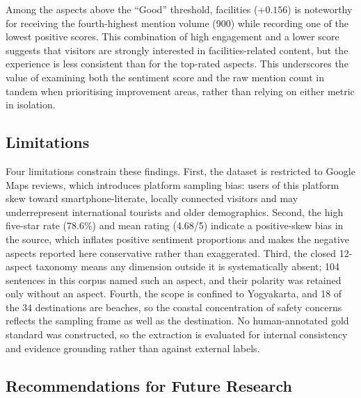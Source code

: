\documentclass[pdflatex,sn-mathphys-num]{sn-jnl}
\begin{document}
Among the aspects above the ``Good'' threshold, facilities ($+0.156$) is noteworthy for receiving the fourth-highest mention volume (900) while recording one of the lowest positive scores. This combination of high engagement and a lower score suggests that visitors are strongly interested in facilities-related content, but the experience is less consistent than for the top-rated aspects. This underscores the value of examining both the sentiment score and the raw mention count in tandem when prioritising improvement areas, rather than relying on either metric in isolation.

\subsection{Limitations}\label{subsec10}

Four limitations constrain these findings. First, the dataset is restricted to Google Maps reviews, which introduces platform sampling bias: users of this platform skew toward smartphone-literate, locally connected visitors and may underrepresent international tourists and older demographics. Second, the high five-star rate (78.6\%) and mean rating (4.68/5) indicate a positive-skew bias in the source, which inflates positive sentiment proportions and makes the negative aspects reported here conservative rather than exaggerated. Third, the closed 12-aspect taxonomy means any dimension outside it is systematically absent; 104 sentences in this corpus named such an aspect, and their polarity was retained only without an aspect. Fourth, the scope is confined to Yogyakarta, and 18 of the 34 destinations are beaches, so the coastal concentration of safety concerns reflects the sampling frame as well as the destination. No human-annotated gold standard was constructed, so the extraction is evaluated for internal consistency and evidence grounding rather than against external labels.

\subsection{Recommendations for Future Research}\label{subsec11}
\end{document}
